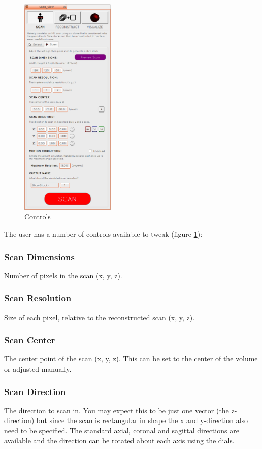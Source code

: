 \begin{figure}
  \vspace{-20pt}
  \includegraphics[width=0.4\textwidth]{images/scan_simulation/scan_settings.png}
  \caption{Controls}\label{fig:scansettings}
\end{figure}

The user has a number of controls available to tweak (figure \ref{fig:scansettings}):

\subsubsection*{Scan Dimensions}
Number of pixels in the scan (x, y, z).

\subsubsection*{Scan Resolution}
Size of each pixel, relative to the reconstructed scan (x, y, z).

\subsubsection*{Scan Center}
The center point of the scan (x, y, z). This can be set to the center of the volume or adjusted manually.

\subsubsection*{Scan Direction}
The direction to scan in. You may expect this to be just one vector (the z-direction) but since the scan is rectangular in shape the x and y-direction also need to be specified. The standard axial, coronal and sagittal directions are available and the direction can be rotated about each axis using the dials.

